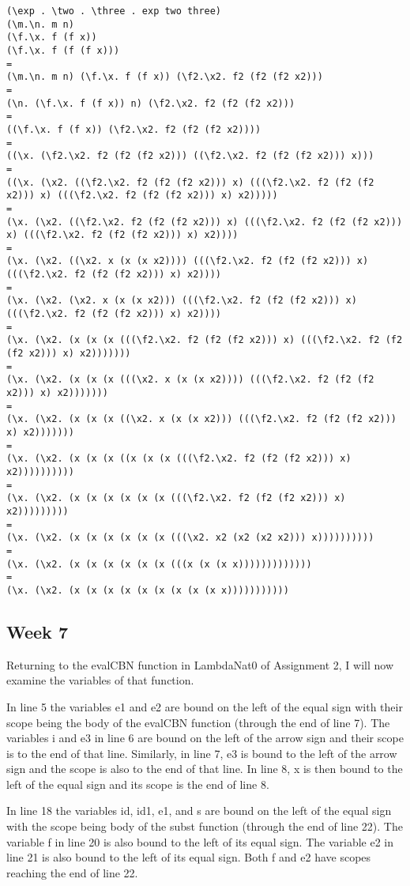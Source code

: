\documentclass{article}
\theoremstyle{theorem}
\theoremstyle{definition}
\theoremstyle{remark}
\begin{document}
\begin{lstlisting}
(\exp . \two . \three . exp two three)
(\m.\n. m n)
(\f.\x. f (f x))
(\f.\x. f (f (f x)))
=
(\m.\n. m n) (\f.\x. f (f x)) (\f2.\x2. f2 (f2 (f2 x2)))
=
(\n. (\f.\x. f (f x)) n) (\f2.\x2. f2 (f2 (f2 x2)))
=
((\f.\x. f (f x)) (\f2.\x2. f2 (f2 (f2 x2))))
=
((\x. (\f2.\x2. f2 (f2 (f2 x2))) ((\f2.\x2. f2 (f2 (f2 x2))) x)))
=
((\x. (\x2. ((\f2.\x2. f2 (f2 (f2 x2))) x) (((\f2.\x2. f2 (f2 (f2 x2))) x) (((\f2.\x2. f2 (f2 (f2 x2))) x) x2)))))
=
(\x. (\x2. ((\f2.\x2. f2 (f2 (f2 x2))) x) (((\f2.\x2. f2 (f2 (f2 x2))) x) (((\f2.\x2. f2 (f2 (f2 x2))) x) x2))))
=
(\x. (\x2. ((\x2. x (x (x x2)))) (((\f2.\x2. f2 (f2 (f2 x2))) x) (((\f2.\x2. f2 (f2 (f2 x2))) x) x2))))
=
(\x. (\x2. (\x2. x (x (x x2))) (((\f2.\x2. f2 (f2 (f2 x2))) x) (((\f2.\x2. f2 (f2 (f2 x2))) x) x2))))
=
(\x. (\x2. (x (x (x (((\f2.\x2. f2 (f2 (f2 x2))) x) (((\f2.\x2. f2 (f2 (f2 x2))) x) x2)))))))
=
(\x. (\x2. (x (x (x (((\x2. x (x (x x2)))) (((\f2.\x2. f2 (f2 (f2 x2))) x) x2)))))))
=
(\x. (\x2. (x (x (x ((\x2. x (x (x x2))) (((\f2.\x2. f2 (f2 (f2 x2))) x) x2)))))))
=
(\x. (\x2. (x (x (x ((x (x (x (((\f2.\x2. f2 (f2 (f2 x2))) x) x2))))))))))
=
(\x. (\x2. (x (x (x (x (x (x (((\f2.\x2. f2 (f2 (f2 x2))) x) x2)))))))))
=
(\x. (\x2. (x (x (x (x (x (x (((\x2. x2 (x2 (x2 x2))) x))))))))))
=
(\x. (\x2. (x (x (x (x (x (x (((x (x (x x)))))))))))))
=
(\x. (\x2. (x (x (x (x (x (x (x (x (x x)))))))))))
\end{lstlisting}

\subsection{Week 7}

Returning to the evalCBN function in LambdaNat0 of Assignment 2, I will now examine the variables of that function.

\medskip\noindent
In line 5 the variables e1 and e2 are bound on the left of the equal sign with their scope being the body of the evalCBN function (through the end of line 7). The variables i and e3 in line 6 are bound on the left of the arrow sign and their scope is to the end of that line. Similarly, in line 7, e3 is bound to the left of the arrow sign and the scope is also to the end of that line. In line 8, x is then bound to the left of the equal sign and its scope is the end of line 8.

\medskip\noindent
In line 18 the variables id, id1, e1, and s are bound on the left of the equal sign with the scope being body of the subst function (through the end of line 22). The variable f in line 20 is also bound to the left of its equal sign. The variable e2 in line 21 is also bound to the left of its equal sign. Both f and e2 have scopes reaching the end of line 22.
\end{document}
